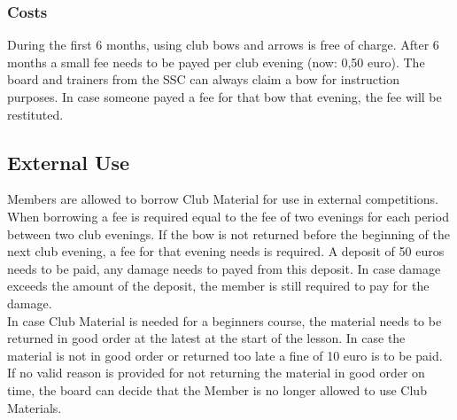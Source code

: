 \documentclass[a4paper]{article}
\begin{document}
\subsubsection{Costs}
During the first 6 months, using club bows and arrows is free of charge. After 6 months a small fee needs to be payed per club evening (now: 0,50 euro). The board and trainers from the SSC can always claim a bow for instruction purposes. In case someone payed a fee for that bow that evening, the fee will be restituted.

\subsection{External Use}
Members are allowed to borrow Club Material for use in external competitions. When borrowing a fee is required equal to the fee of two evenings for each period between two club evenings. If the bow is not returned before the beginning of the next club evening, a fee for that evening needs is required. A deposit of 50 euros needs to be paid, any damage needs to payed from this deposit. In case damage exceeds the amount of the deposit, the member is still required to pay for the damage. \\

In case Club Material is needed for a beginners course, the material needs to be returned in good order at the latest at the start of the lesson. In case the material is not in good order or returned too late a fine of 10 euro is to be paid. If no valid reason is provided for not returning the material in good order on time, the board can decide that the Member is no longer allowed to use Club Materials.
\end{document}
